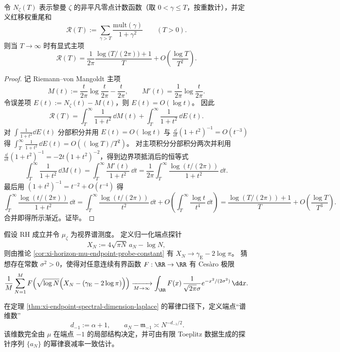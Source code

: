 \begin{theorem}[红移权重尾项的主项可积化]\label{thm:xi-redshift-tail-main-term}
令 \(N_{\zeta}(T)\) 表示黎曼 \(\zeta\) 的非平凡零点计数函数（取 \(0<\gamma\le T\)，按重数计），并定义红移权重尾和
\[
\mathcal{R}(T):=\sum_{\gamma>T}\frac{\mathrm{mult}(\gamma)}{1+\gamma^2}\qquad(T>0).
\]
则当 \(T\to\infty\) 时有显式主项
\[
\boxed{\;
\mathcal{R}(T)=\frac{1}{2\pi}\frac{\log\!\bigl(T/(2\pi)\bigr)+1}{T}
+O\!\left(\frac{\log T}{T^{2}}\right).\;}
\]
\end{theorem}
\begin{proof}
记 Riemann--von Mangoldt 主项
\[
M(t):=\frac{t}{2\pi}\log\frac{t}{2\pi}-\frac{t}{2\pi},
\qquad
M'(t)=\frac{1}{2\pi}\log\frac{t}{2\pi}.
\]
令误差项 \(E(t):=N_{\zeta}(t)-M(t)\)，则 \(E(t)=O(\log t)\)。
因此
\[
\mathcal{R}(T)
=\int_{T}^{\infty}\frac{1}{1+t^{2}}\,\dd M(t)+\int_{T}^{\infty}\frac{1}{1+t^{2}}\,\dd E(t).
\]
对 \(\int \frac{1}{1+t^2}\dd E(t)\) 分部积分并用 \(E(t)=O(\log t)\) 与 \(\frac{\dd}{\dd t}(1+t^2)^{-1}=O(t^{-3})\) 得
\(
\int_{T}^{\infty}\frac{1}{1+t^{2}}\,\dd E(t)=O((\log T)/T^{2})
\)。
对主项积分分部积分两次并利用 \(\frac{\dd}{\dd t}(1+t^{2})^{-1}=-2t(1+t^{2})^{-2}\)，得到边界项抵消后的恒等式
\[
\int_{T}^{\infty}\frac{1}{1+t^{2}}\,\dd M(t)
=\int_{T}^{\infty}\frac{M'(t)}{1+t^{2}}\,\dd t
=\frac{1}{2\pi}\int_{T}^{\infty}\frac{\log(t/(2\pi))}{1+t^{2}}\,\dd t.
\]
最后用 \((1+t^{2})^{-1}=t^{-2}+O(t^{-4})\) 得
\[
\int_{T}^{\infty}\frac{\log(t/(2\pi))}{1+t^{2}}\,\dd t
=\int_{T}^{\infty}\frac{\log(t/(2\pi))}{t^{2}}\,\dd t
+O\!\left(\int_{T}^{\infty}\frac{\log t}{t^{4}}\,\dd t\right)
=\frac{\log(T/(2\pi))+1}{T}
+O\!\left(\frac{\log T}{T^{3}}\right).
\]
合并即得所示渐近。证毕。
\end{proof}

\begin{conjecture}[对数端点窗下端点探针的涨落分布]\label{conj:xi-endpoint-logwindow-fluctuation}
假设 RH 成立并令 \(\mu_{\zeta}\) 为视界谱测度。
定义归一化端点探针
\[
X_N:=4\sqrt{\pi N}\,a_N-\log N,
\]
则由推论 \ref{cor:xi-horizon-mu-endpoint-probe-constant} 有 \(X_N\to \gamma_{\mathrm E}-2\log\pi\)。
猜想存在常数 \(\sigma^{2}>0\)，使得对任意连续有界函数 \(F:\RR\to\RR\) 有 Ces\`aro 极限
\[
\frac{1}{M}\sum_{N=1}^{M}
F\!\left(\sqrt{\log N}\Bigl(X_N-(\gamma_{\mathrm E}-2\log\pi)\Bigr)\right)
\xrightarrow[M\to\infty]{}
\int_{\RR}F(x)\,\frac{1}{\sqrt{2\pi}\sigma}e^{-x^{2}/(2\sigma^{2})}\,\dd x .
\]
\end{conjecture}

\begin{definition}[端点谱维数]\label{def:xi-endpoint-spectral-dimension}
在定理 \ref{thm:xi-endpoint-spectral-dimension-laplace} 的幂律口径下，定义端点“谱维数”
\[
\boxed{\;
d_{-1}:=\alpha+1,\qquad
a_N-\mathfrak m_{-1}\asymp N^{-d_{-1}/2}.}
\]
该维数完全由 \(\mu\) 在端点 \(-1\) 的局部结构决定，并可由有限 Toeplitz 数据生成的探针序列 \(\{a_N\}\) 的幂律衰减率一致估计。
\end{definition}


